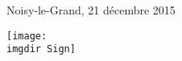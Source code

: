 Noisy-le-Grand, 21 décembre 2015

\ifprinted
\else
  \centering
  \texttt{[image: \\imgdir Sign]}
\fi

